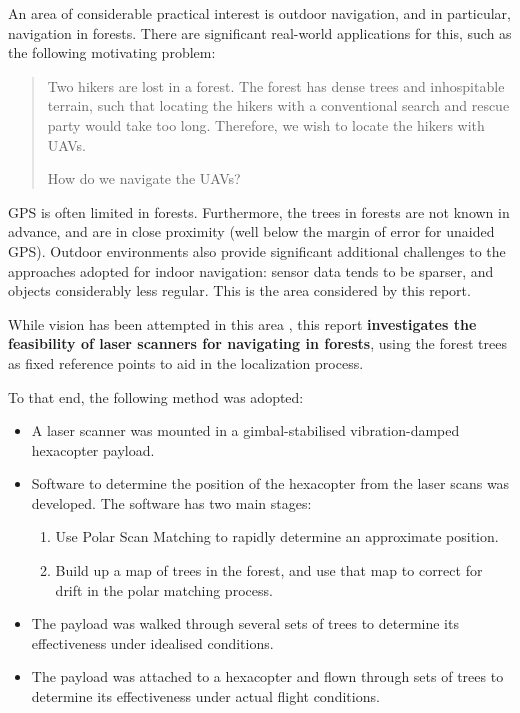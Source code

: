 \documentclass[12pt,oneside,a4paper]{book}
\begin{document}
An area of considerable practical interest is outdoor navigation, and
in particular, navigation in forests.  There are significant real-world
applications for this, such as the following motivating problem:
\begin{quote}
  Two hikers are lost in a forest. The forest has dense trees and
  inhospitable terrain, such that locating the hikers with a
  conventional search and rescue party would take too long. Therefore,
  we wish to locate the hikers with UAVs.

  How do we navigate the UAVs?
\end{quote}

GPS is often limited in forests. Furthermore, the trees in forests are
not known in advance, and are in close proximity (well below the
margin of error for unaided GPS). Outdoor environments also provide
significant additional challenges to the approaches adopted for indoor
navigation: sensor data tends to be sparser, and objects considerably
less regular. This is the area considered by this report.

While vision has been attempted in this area
\cite{langelaan2005towards}, this report \textbf{investigates the
  feasibility of laser scanners for navigating in forests}, using the
forest trees as fixed reference points to aid in the localization
process.


To that end, the following method was adopted:
\begin{itemize}
\item A laser scanner was mounted in a gimbal-stabilised
  vibration-damped hexacopter payload.
\item Software to determine the position of the hexacopter from the
  laser scans was developed. The software has two main stages:
  \begin{enumerate}
  \item Use Polar Scan Matching to rapidly determine an approximate
    position.
  \item Build up a map of trees in the forest, and use that map to
    correct for drift in the polar matching process.
  \end{enumerate}
\item The payload was walked through several sets of trees to determine
  its effectiveness under idealised conditions.
\item The payload was attached to a hexacopter and flown through sets
  of trees to determine its effectiveness under actual flight conditions.
\end{itemize}
\end{document}
